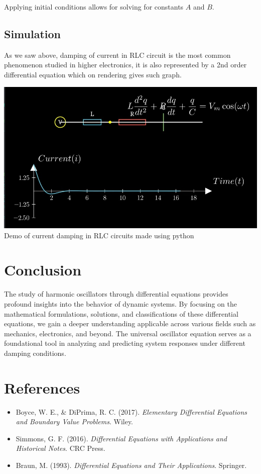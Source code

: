 \documentclass[12pt,a4paper]{article}
\begin{document}
Applying initial conditions allows for solving for constants \( A \) and \( B \).


\subsection{Simulation}

As we saw above, damping of current in RLC circuit is the most common phenomenon studied in higher electronics, it is also represented by a 2nd order differential equation which on rendering gives such graph.

\begin{center}
    \includegraphics[scale=0.3]{damped_rlc}\\
    Demo of current damping in RLC circuits made using python
\end{center}


\section{Conclusion}

The study of harmonic oscillators through differential equations provides profound insights into the behavior of dynamic systems. By focusing on the mathematical formulations, solutions, and classifications of these differential equations, we gain a deeper understanding applicable across various fields such as mechanics, electronics, and beyond. The universal oscillator equation serves as a foundational tool in analyzing and predicting system responses under different damping conditions. 

\section{References}

\begin{itemize}
    \item Boyce, W. E., \& DiPrima, R. C. (2017). \textit{Elementary Differential Equations and Boundary Value Problems}. Wiley.
    \item Simmons, G. F. (2016). \textit{Differential Equations with Applications and Historical Notes}. CRC Press.
    \item Braun, M. (1993). \textit{Differential Equations and Their Applications}. Springer.
\end{itemize}
\end{document}
